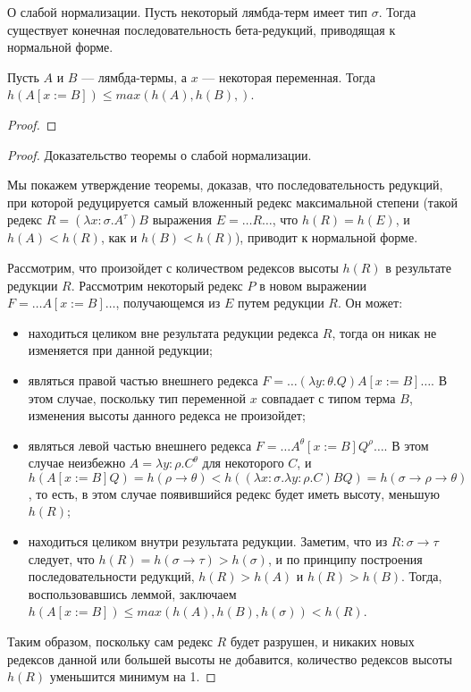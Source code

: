 \begin{theorem} О слабой нормализации. Пусть некоторый лямбда-терм имеет
тип $\sigma$. Тогда существует конечная последовательность бета-редукций,
приводящая к нормальной форме.
\end{theorem}

\begin{lemma}
Пусть $A$ и $B$ --- лямбда-термы, а $x$ --- некоторая переменная.
Тогда $h(A[x := B]) \le max(h(A),h(B),)$.
\end{lemma}

\begin{proof}
\end{proof}

\begin{proof}Доказательство теоремы о слабой нормализации.

Мы покажем утверждение теоремы, доказав, что последовательность редукций,
при которой редуцируется самый вложенный редекс максимальной степени
(такой редекс $R = (\lambda x:\sigma.A^\tau) B$ выражения 
$E = \dots R \dots$, что $h(R) = h(E)$, и $h(A) < h(R)$, как и $h(B) < h(R)$),
приводит к нормальной форме.

Рассмотрим, что произойдет с количеством редексов высоты $h(R)$ в результате редукции 
$R$. Рассмотрим некоторый редекс $P$ в новом выражении $F = \dots A[x := B] \dots$, 
получающемся из $E$ путем редукции $R$. Он может:
\begin{itemize}
\item находиться целиком вне результата редукции редекса $R$, тогда он никак не изменяется при 
данной редукции;
\item являться правой частью внешнего редекса $F = \dots (\lambda y:\theta.Q) A[x:=B] \dots$.
В этом случае, поскольку тип переменной $x$ совпадает с типом
терма $B$, изменения высоты данного редекса не произойдет;
\item являться левой частью внешнего редекса $F = \dots A^\theta[x:=B] Q^\rho \dots$.
В этом случае неизбежно $A = \lambda y:\rho.C^\theta$ для некоторого $C$, 
и $h(A[x:=B] Q) = h(\rho\rightarrow\theta) < h((\lambda x:\sigma.\lambda y:\rho.C) B Q) =
h(\sigma\rightarrow\rho\rightarrow\theta)$, то есть, в этом случае появившийся редекс
будет иметь высоту, меньшую $h(R)$;
\item находиться целиком внутри результата редукции. Заметим, что из $R: \sigma \rightarrow \tau$ 
следует, что $h(R) = h(\sigma\rightarrow\tau) > h(\sigma)$, и по принципу построения 
последовательности редукций, $h(R) > h(A)$ и $h(R) > h(B)$.
Тогда, воспользовавшись леммой, заключаем $h(A[x:=B]) \le max(h(A),h(B),h(\sigma)) < h(R)$.
\end{itemize}
Таким образом, поскольку сам редекс $R$ будет разрушен, и никаких новых редексов данной или 
большей высоты не добавится, количество редексов высоты $h(R)$ уменьшится минимум на 1.


\end{proof}
